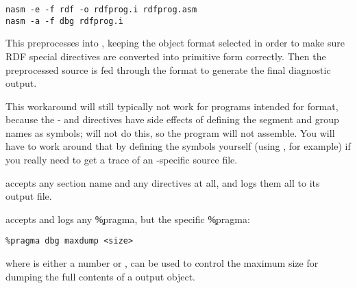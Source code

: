 \begin{lstlisting}
nasm -e -f rdf -o rdfprog.i rdfprog.asm
nasm -a -f dbg rdfprog.i
\end{lstlisting}

This preprocesses  into , keeping the
 object format selected in order to make sure RDF special
directives are converted into primitive form correctly. Then the
preprocessed source is fed through the  format to generate
the final diagnostic output.

This workaround will still typically not work for programs intended
for  format, because the -  and 
directives have side effects of defining the segment and group names
as symbols;  will not do this, so the program will not
assemble. You will have to work around that by defining the symbols
yourself (using , for example) if you really need to get a
 trace of an -specific source file.

 accepts any section name and any directives at all, and logs
them all to its output file.

 accepts and logs any \c{\%pragma}, but the specific
\c{\%pragma}:

\begin{lstlisting}
%pragma dbg maxdump <size>
\end{lstlisting}

where  is either a number or , can be
used to control the maximum size for dumping the full contents of a
 output object.
